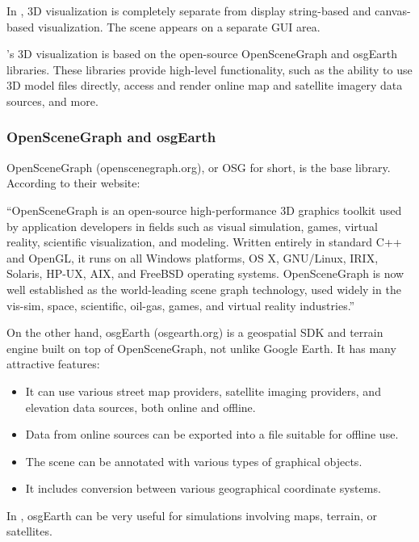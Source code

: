 In {\opp}, 3D visualization is completely separate from display string-based and
canvas-based visualization. The scene appears on a separate GUI area.

{\opp}'s 3D visualization is based on the open-source OpenSceneGraph and
osgEarth libraries. These libraries provide high-level functionality, such as
the ability to use 3D model files directly, access and render online map and
satellite imagery data sources, and more.

\subsubsection{OpenSceneGraph and osgEarth}
\label{sec:graphics:osg-and-osgearth}

OpenSceneGraph (openscenegraph.org), or OSG for short, is the base library.
According to their website:

\begin{displayquote}
``OpenSceneGraph is an open-source high-performance 3D graphics toolkit used by
application developers in fields such as visual simulation, games, virtual
reality, scientific visualization, and modeling. Written entirely in standard
C++ and OpenGL, it runs on all Windows platforms, OS X, GNU/Linux, IRIX,
Solaris, HP-UX, AIX, and FreeBSD operating systems. OpenSceneGraph is now well
established as the world-leading scene graph technology, used widely in the
vis-sim, space, scientific, oil-gas, games, and virtual reality industries.''
\end{displayquote}

On the other hand, osgEarth (osgearth.org) is a geospatial SDK and terrain
engine built on top of OpenSceneGraph, not unlike Google Earth. It has many
attractive features:

\begin{itemize}
  \item It can use various street map providers, satellite imaging providers, and
    elevation data sources, both online and offline.
  \item Data from online sources can be exported into a file suitable for offline use.
  \item The scene can be annotated with various types of graphical objects.
  \item It includes conversion between various geographical coordinate systems.
\end{itemize}

In \opp, osgEarth can be very useful for simulations involving maps, terrain, or satellites.

